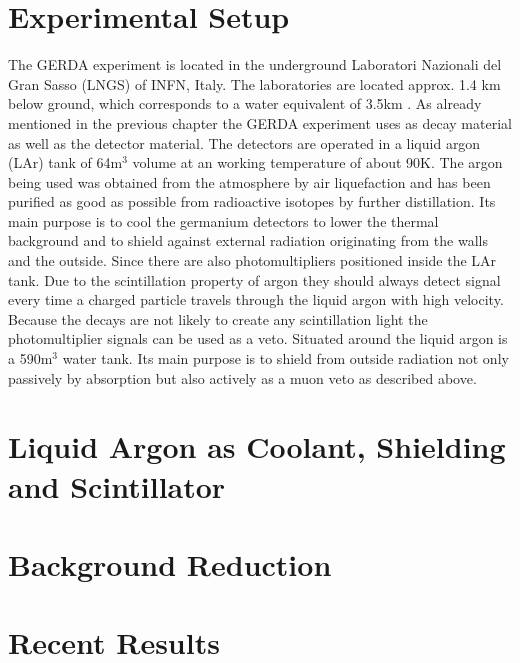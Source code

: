 \section{Experimental Setup}
\label{sec:ExSetup}
The GERDA experiment is located in the underground Laboratori Nazionali del Gran Sasso (LNGS) of INFN, Italy.
The laboratories are located approx. 1.4 km below ground, which corresponds to a water equivalent of 3.5km \cite{agostini_background_2017}.
As already mentioned in the previous chapter the GERDA experiment uses  as \onbb decay material as well as the detector material.
The detectors are operated in a liquid argon (LAr) tank of 64m$^3$ volume at an working temperature of about 90K.
The argon being used was obtained from the atmosphere by air liquefaction and has been purified as good as possible from radioactive isotopes by further distillation.
Its main purpose is to cool the germanium detectors to lower the thermal background and to shield against external radiation originating from the walls and the outside. 
Since \PII there are also photomultipliers positioned inside the LAr tank.
Due to the scintillation property of argon they should always detect signal every time a charged particle travels through the liquid argon with high velocity.
Because the \onbb decays are not likely to create any scintillation light the photomultiplier signals can be used as a veto.
Situated around the liquid argon is a 590m$^3$ water tank.
Its main purpose is to shield from outside radiation not only passively by absorption but also actively as a muon veto as described above.
\\


\section{Liquid Argon as Coolant, Shielding and Scintillator} 
\label{sec:LArcoolant}


\section{Background Reduction}
\label{sec:BGReduction}



\section{Recent Results}
\label{sec:ResultsofGERDA}

